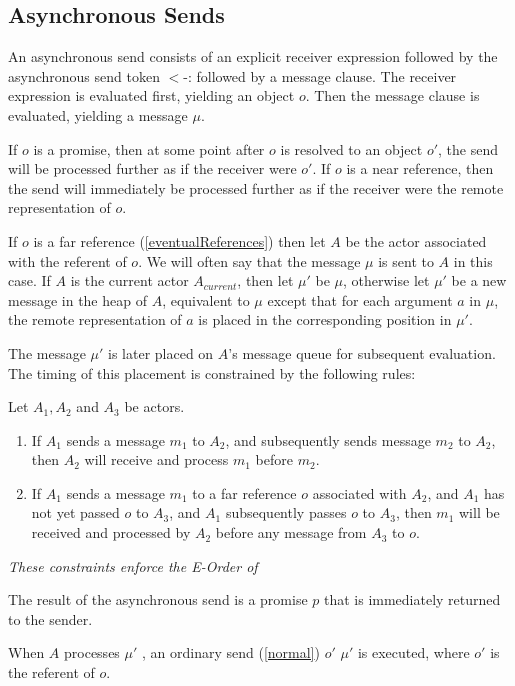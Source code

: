 \documentclass{article}
\begin{document}
\subsection{Asynchronous Sends}
\label{asynchronousSends}

An asynchronous send consists of an explicit receiver expression followed by the asynchronous send token $<$-: followed by a message clause. 
The receiver expression is evaluated first, yielding an object $o$. Then the message clause is evaluated, yielding a message $\mu$.

If $o$ is a promise, then at some point after $o$ is resolved to an object $o'$, the send will be processed further as if the receiver were $o'$. If $o$ is a near reference, then the send will immediately be processed further as if the receiver were the remote representation of $o$. 

If $o$ is a far reference (\ref{eventualReferences}) then let $A$ be the actor associated with the referent of $o$. We will often say that the message $\mu$ is sent to $A$ in this case. 
 If $A$ is the current actor $A_{current}$, then let $\mu'$ be $\mu$, otherwise let $\mu'$ be a new message in the heap of $A$, equivalent to $\mu$ except that for each argument $a$ in $\mu$, the remote representation of $a$ is placed in the corresponding position in $\mu'$. 

The message $\mu'$ is later placed on $A$'s message queue for subsequent evaluation. The timing of this placement is  constrained by the following rules:

Let $A_1, A_2$ and $A_3$ be actors.
\begin{enumerate}
\item If  $A_1$ sends a message $m_1$ to  $A_2$, and subsequently sends message $m_2$ to $A_2$, then $A_2$ will receive and process $m_1$ before $m_2$.
\item  If $A_1$ sends a message $m_1$ to a far reference $o$ associated with $A_2$, and  $A_1$ has not yet passed $o$ to $A_3$, and $A_1$ subsequently passes $o$ to $A_3$, then $m_1$ will be received and processed by $A_2$ before any message from $A_3$ to $o$.
\end{enumerate}

{\it  These constraints enforce the E-Order of \cite{RobustComposition}}


The result of the asynchronous send is a promise $p$ that is immediately returned to the sender.

When $A$ processes $\mu'$ , an ordinary send (\ref{normal}) $o'$ $\mu'$ is executed, where $o'$ is the referent of $o$. 
\end{document}
